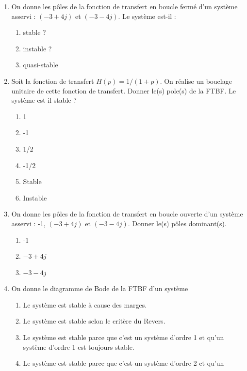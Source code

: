 \documentclass[10pt,fleqn]{article} %
\begin{document}
\def\pathfig{images}

\vspace{4.5cm}
\pagestyle{fancy}
\thispagestyle{plain}

\def\columnseprulecolor{\color{ocre}}
\setlength{\columnseprule}{0.4pt} 

\def\pathfig{images}

\begin{multicols}{2}
\begin{enumerate}
\item On donne les pôles de la fonction de transfert en boucle fermé d'un système
asservi : $(-3+4j)$ et $(-3-4j)$. Le système est-il :
\begin{enumerate}
\item stable ?
\item  instable ?
\item  quasi-stable 
\end{enumerate}
\item Soit la fonction de transfert $H(p)=1/(1+p)$. On réalise un bouclage unitaire de
cette fonction de transfert. Donner le(s) pole(s) de la FTBF. Le système est-il stable ?
\begin{enumerate}
\item 1
\item  -1
\item  1/2
\item  -1/2
\item  Stable
\item  Instable
\end{enumerate}
\item On donne les pôles de la fonction de transfert en boucle ouverte d'un système
asservi : -1, $(-3+4j)$ et $(-3-4j)$. Donner le(s) pôles dominant(s).
\begin{enumerate}
\item -1
\item  $-3+4j$
\item  $-3-4j$
\end{enumerate}
\item On donne le diagramme de Bode de la FTBF d'un système
\begin{enumerate}
\item Le système est stable à cause des marges.
\item Le système est stable selon le critère du Revers.
\item Le système est stable parce que c'est un système d'ordre 1 et qu'un
système d'ordre 1 est toujours stable.
\item Le système est stable parce que c'est un système d'ordre 2 et qu'un

\end{enumerate}
\end{enumerate}
\end{multicols}
\end{document}
